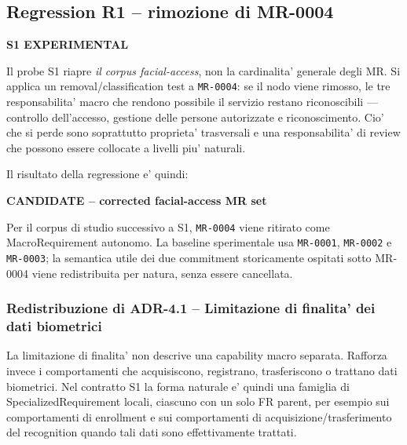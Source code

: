 \documentclass[11pt,a4paper]{article}
\newcommand{\experimental}{\textbf{S1 EXPERIMENTAL}}
\newenvironment{statusbox}[1]{%
  \def\FrameCommand{\fcolorbox{ddtablue}{ddtagray}}%
  \MakeFramed{\advance\hsize-2\width\FrameRestore}
  \noindent\textbf{#1}\par\smallskip
}{\endMakeFramed}
\begin{document}
\subsection{Regression R1 -- rimozione di MR-0004}

\experimental{}

Il probe S1 riapre \emph{il corpus facial-access}, non la cardinalita' generale degli MR. Si applica un removal/classification test a \texttt{MR-0004}: se il nodo viene rimosso, le tre responsabilita' macro che rendono possibile il servizio restano riconoscibili --- controllo dell'accesso, gestione delle persone autorizzate e riconoscimento. Cio' che si perde sono soprattutto proprieta' trasversali e una responsabilita' di review che possono essere collocate a livelli piu' naturali.

Il risultato della regressione e' quindi:

\begin{center}
\end{center}

\begin{statusbox}{CANDIDATE -- corrected facial-access MR set}
Per il corpus di studio successivo a S1, \texttt{MR-0004} viene ritirato come MacroRequirement autonomo. La baseline sperimentale usa \texttt{MR-0001}, \texttt{MR-0002} e \texttt{MR-0003}; la semantica utile dei due commitment storicamente ospitati sotto MR-0004 viene redistribuita per natura, senza essere cancellata.
\end{statusbox}

\subsubsection{Redistribuzione di ADR-4.1 -- Limitazione di finalita' dei dati biometrici}

La limitazione di finalita' non descrive una capability macro separata. Rafforza invece i comportamenti che acquisiscono, registrano, trasferiscono o trattano dati biometrici. Nel contratto S1 la forma naturale e' quindi una famiglia di SpecializedRequirement locali, ciascuno con un solo FR parent, per esempio sui comportamenti di enrollment e sui comportamenti di acquisizione/trasferimento del recognition quando tali dati sono effettivamente trattati.
\end{document}
